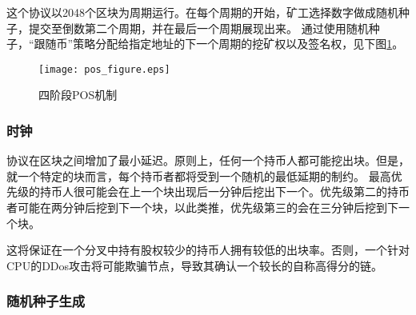 \documentclass[letterpaper]{article}
\begin{document}
这个协议以\num{2048}个区块为周期运行。在每个周期的开始，矿工选择数字做成随机种子，提交至倒数第二个周期，并在最后一个周期展现出来。
通过使用随机种子，“跟随币”策略分配给指定地址的下一个周期的挖矿权以及签名权，见下图\ref{fig:pos_figure}。

\begin{figure}[b!]
  \centering
  \texttt{[image: pos\_figure.eps]}
  \caption{四阶段POS机制}
  \label{fig:pos_figure}
\end{figure}


\subsubsection{时钟}

协议在区块之间增加了最小延迟。原则上，任何一个持币人都可能挖出块。但是，就一个特定的块而言，每个持币者都将受到一个随机的最低延期的制约。
最高优先级的持币人很可能会在上一个块出现后一分钟后挖出下一个。优先级第二的持币者可能在两分钟后挖到下一个块，以此类推，优先级第三的会在三分钟后挖到下一个块。

这将保证在一个分叉中持有股权较少的持币人拥有较低的出块率。否则，一个针对CPU的DDos攻击将可能欺骗节点，导致其确认一个较长的自称高得分的链。

\subsubsection{随机种子生成}
\end{document}
